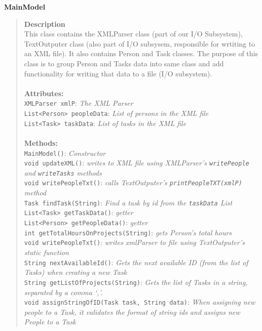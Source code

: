 \documentclass[12pt]{article}
\begin{document}
{\bf MainModel}
\begin{quote}
{\bf Description}\\
This class contains the XMLParser class (part of our I/O Subsystem), TextOutputer class (also part of I/O subsysem, responsible for wrtiting to an XML file). It also contains Person and Task classes. The purpose of this class is to group Person and Tasks data into same class and add functionality for writing that data to a file (I/O subsystem).\\\\
{\bf Attributes:}\\
\texttt{XMLParser xmlP}: \emph{The XML Parser}\\
\texttt{List<Person> peopleData}: \emph{List of persons in the XML file}\\
\texttt{List<Task> taskData}: \emph{List of tasks in the XML file}\\\\
{\bf Methods:}\\
\texttt{MainModel()}: \emph{Constructor}\\
\texttt{void updateXML()}: \emph{writes to XML file using XMLParser's \texttt{writePeople} and \texttt{writeTasks} methods}\\
\texttt{void writePeopleTxt()}: \emph{calls TextOutputer's \texttt{printPeopleTXT(xmlP)} method}\\
\texttt{Task findTask(String)}: \emph{Find a task by id from the \texttt{taskData} List}\\
\texttt{List<Task> getTaskData()}: \emph{getter}\\
\texttt{List<Person> getPeopleData()}: \emph{getter}\\
\texttt{int getTotalHoursOnProjects(String)}: \emph{gets Person's total hours}\\
\texttt{void writePeopleTxt()}: \emph{writes xmlParser to file using TextOutputer's static function}\\
\texttt{String nextAvailableId()}: \emph{Gets the next available ID (from the list of Tasks) when creating a new Task}\\
\texttt{String getListOfProjects(String)}: \emph{Gets the list of Tasks in a string, separated by a comma `,'.}\\
\texttt{void assignStringOfID(Task task, String data)}: \emph{When assigning new people to a Task, it validates the format of string ids and assigns new People to a Task}
\end{quote}
 
\end{document}
